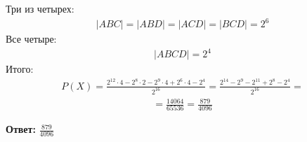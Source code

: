 \documentclass[a4paper,12pt]{article}
\begin{document}
Три из четырех:
\begin{equation*}
\begin{gathered}
|ABC| = |ABD| = |ACD| = |BCD| = 2^6
\end{gathered}
\end{equation*}
Все четыре:
\begin{equation*}
\begin{gathered}
|ABCD| = 2^4
\end{gathered}
\end{equation*}
Итого:
\begin{equation*}
\begin{gathered}
P(X) = \frac{2^{12} \cdot 4 - 2^8 \cdot 2 - 2^9 \cdot 4 + 2^6 \cdot 4 - 2^4}{2^{16}} = \frac{2^{14} - 2^9 - 2^{11} + 2^8 - 2^4}{2^{16}} =
\end{gathered}
\end{equation*}
\begin{equation*}
\begin{gathered}
= 
\frac{14064}{65536} = \frac{879}{4096}
\end{gathered}
\end{equation*}
\begin{center}
\textbf{Ответ: } $\frac{879}{4096}$
\end{center}
\end{document}

